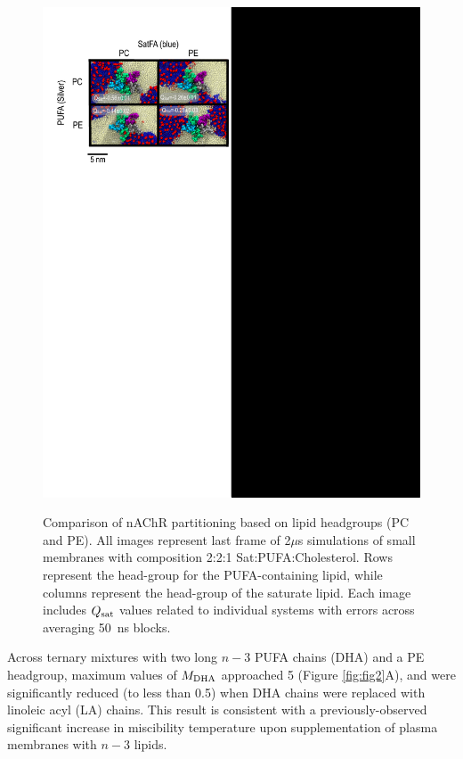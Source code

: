 	\begin{figure}[!ht]
		{
		\includegraphics[width=1\linewidth]{ModelMemb_Images/SI_Q.pdf}}
		\caption[ Comparison of nAChR partitioning based on lipid headgroups (PC and PE).] {Comparison of nAChR partitioning based on lipid headgroups (PC and PE). All images represent last frame of 2$\mu$s  simulations of small membranes with composition  2:2:1 Sat:PUFA:Cholesterol.  Rows represent the head-group for the PUFA-containing lipid, while columns represent the head-group of the saturate lipid.   Each image includes $Q_{\mathrm{sat}}$ values related to individual systems with errors across averaging 50~ns blocks.}
		\label{fig:SIQ}
	\end{figure}
	Across ternary mixtures with two long $n-3$ PUFA chains (DHA) and a PE headgroup, maximum values of $M_{\mathrm{DHA}}$ approached 5 (Figure \ref{fig:fig2}A), and were significantly reduced (to less than 0.5) when DHA chains were replaced with linoleic acyl (LA) chains. This result is consistent with a previously-observed significant increase in miscibility temperature upon supplementation of plasma membranes with $n-3$ lipids.  \citep{Levental_Polyunsaturated_2016} 
	
